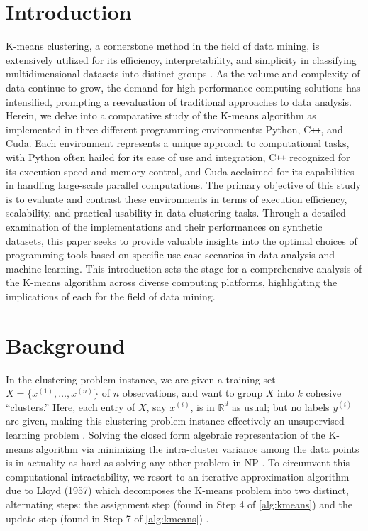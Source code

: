 \documentclass{article}
\begin{document}
  \section{Introduction}
  {\sc K-means} clustering, a cornerstone method in the field of data mining,
  is extensively utilized for its efficiency, interpretability, and simplicity
  in classifying multidimensional datasets into distinct groups \cite{blum2020foundations}.
  As the volume and complexity of data continue to grow, the demand for high-performance
  computing solutions has intensified, prompting a reevaluation of traditional
  approaches to data analysis. Herein, we delve into a comparative
  study of the {\sc K-means} algorithm as implemented in three different
  programming environments: {\sc Python}, {\sc C{\tt ++}}, and {\sc Cuda}. Each
  environment represents a unique approach to computational tasks, with {\sc Python}
  often hailed for its ease of use and integration, {\sc C{\tt ++}} recognized
  for its execution speed and memory control, and {\sc Cuda} acclaimed for its
  capabilities in handling large-scale parallel computations. The primary
  objective of this study is to evaluate and contrast these environments in
  terms of execution efficiency, scalability, and practical usability in data
  clustering tasks. Through a detailed examination of the implementations and
  their performances on synthetic datasets, this paper seeks to provide valuable
  insights into the optimal choices of programming tools based on specific
  use-case scenarios in data analysis and machine learning. This introduction
  sets the stage for a comprehensive analysis of the {\sc K-means} algorithm
  across diverse computing platforms, highlighting the implications of each
  for the field of data mining.

  \section{Background}
  In the clustering problem instance, we are given a training set $X = \{ x^{(1)},
  \ldots, x^{(n)} \}$ of $n$ observations, and want to group $X$ into $k$ cohesive
  ``clusters.'' Here, each entry of $X$, say $x^{(i)}$, is in $\mathbb{R}^d$ as usual;
  but no labels $y^{(i)}$ are given, making this clustering problem instance effectively
  an unsupervised learning problem \cite{ng_k-means}. Solving the closed form algebraic
  representation of the {\sc K-means} algorithm via minimizing the intra-cluster variance
  among the data points is in actuality as hard as solving any other problem in NP
  \cite{phillips2021mathematical}. To circumvent this computational intractability, we
  resort to an iterative approximation algorithm due to Lloyd (1957) which decomposes the
  {\sc K-means} problem into two distinct, alternating steps: the assignment step (found in
  Step 4 of \autoref{alg:kmeans}) and the update step (found in Step 7 of \autoref{alg:kmeans})
  \cite{leskovec2014mining}.
\end{document}
